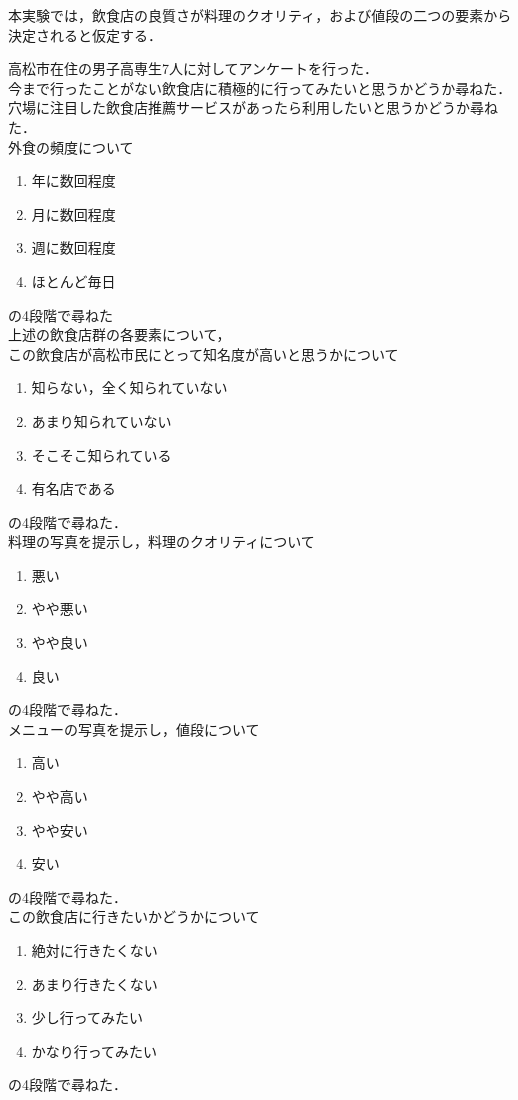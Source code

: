 		本実験では，飲食店の良質さが料理のクオリティ，および値段の二つの要素から決定されると仮定する．\par
		高松市在住の男子高専生7人に対してアンケートを行った．\\
		今まで行ったことがない飲食店に積極的に行ってみたいと思うかどうか尋ねた．\\
		穴場に注目した飲食店推薦サービスがあったら利用したいと思うかどうか尋ねた．\\
		外食の頻度について
		\begin{enumerate}
			\item 年に数回程度
			\item 月に数回程度
			\item 週に数回程度
			\item ほとんど毎日
		\end{enumerate}
		の4段階で尋ねた\\
		上述の飲食店群の各要素について，\\
		この飲食店が高松市民にとって知名度が高いと思うかについて
		\begin{enumerate}
			\item 知らない，全く知られていない
			\item あまり知られていない
			\item そこそこ知られている
			\item 有名店である
		\end{enumerate}
		の4段階で尋ねた．\\
		料理の写真を提示し，料理のクオリティについて
		\begin{enumerate}
			\item 悪い
			\item やや悪い
			\item やや良い
			\item 良い
		\end{enumerate}
		の4段階で尋ねた．\\
		メニューの写真を提示し，値段について
		\begin{enumerate}
			\item 高い
			\item やや高い
			\item やや安い
			\item 安い
		\end{enumerate}
		の4段階で尋ねた．\\
		この飲食店に行きたいかどうかについて
		\begin{enumerate}
			\item 絶対に行きたくない
			\item あまり行きたくない
			\item 少し行ってみたい
			\item かなり行ってみたい
		\end{enumerate}
		の4段階で尋ねた．\\
